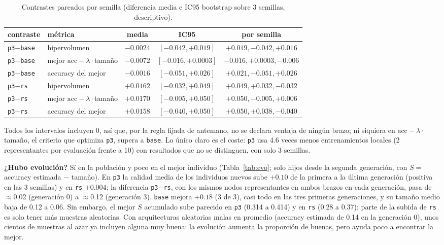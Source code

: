 \documentclass[11pt,a4paper]{article}
\newcommand{\acc}{\mathrm{acc}}
\begin{document}
\begin{table}[h]
\centering\small
\begin{tabular}{llccc}
\toprule
contraste & métrica & media & IC95 & por semilla\\
\midrule
\texttt{p3}$-$\texttt{base} & hipervolumen & $-0.0024$ & $[-0.042,+0.019]$ & $+0.019,-0.042,+0.016$\\
\texttt{p3}$-$\texttt{base} & mejor $\acc-\lambda\cdot$tamaño & $-0.0072$ & $[-0.016,+0.0003]$ & $-0.016,+0.0003,-0.006$\\
\texttt{p3}$-$\texttt{base} & accuracy del mejor & $-0.0016$ & $[-0.051,+0.026]$ & $+0.021,-0.051,+0.026$\\
\texttt{p3}$-$\texttt{rs} & hipervolumen & $+0.0162$ & $[-0.032,+0.049]$ & $+0.049,+0.032,-0.032$\\
\texttt{p3}$-$\texttt{rs} & mejor $\acc-\lambda\cdot$tamaño & $+0.0170$ & $[-0.005,+0.050]$ & $+0.050,-0.005,+0.006$\\
\texttt{p3}$-$\texttt{rs} & accuracy del mejor & $+0.0158$ & $[-0.040,+0.050]$ & $+0.050,+0.038,-0.040$\\
\bottomrule
\end{tabular}
\caption{Contrastes pareados por semilla (diferencia media e IC95 bootstrap sobre 3 semillas, descriptivo).}
\label{tab:p3c}
\end{table}

Todos los intervalos incluyen 0, así que, por la regla fijada de antemano, no se declara ventaja de ningún brazo; ni siquiera en $\acc-\lambda\cdot$tamaño, el criterio que optimiza \texttt{p3}, supera a \texttt{base}. Lo único claro es el coste: \texttt{p3} usa 4.6 veces menos entrenamientos locales (2 representantes por evaluación frente a 10) con resultados que no se distinguen, con solo 3 semillas.

\textbf{¿Hubo evolución?} Sí en la población y poco en el mejor individuo (Tabla~\ref{tab:evo}; solo hijos desde la segunda generación, con $S=$ accuracy estimada $-$ tamaño). En \texttt{p3} la calidad media de los individuos nuevos sube $+0.10$ de la primera a la última generación (positiva en las 3 semillas) y en \texttt{rs} $+0.004$; la diferencia \texttt{p3}$-$\texttt{rs}, con los mismos nodos representantes en ambos brazos en cada generación, pasa de $\approx$0.02 (generación 0) a $\approx$0.12 (generación 3). \texttt{base} mejora $+0.18$ (3 de 3), casi todo en las tres primeras generaciones, y su tamaño medio baja de 0.12 a 0.06. Sin embargo, el mejor $S$ acumulado sube parecido en \texttt{p3} (0.314 a 0.414) y en \texttt{rs} (0.28 a 0.37): parte de la subida de \texttt{rs} es solo tener más muestras aleatorias. Con arquitecturas aleatorias malas en promedio (accuracy estimada de 0.14 en la generación 0), unos cientos de muestras al azar ya incluyen alguna muy buena: la evolución aumenta la proporción de buenas, pero ayuda poco a encontrar la mejor.
\end{document}
